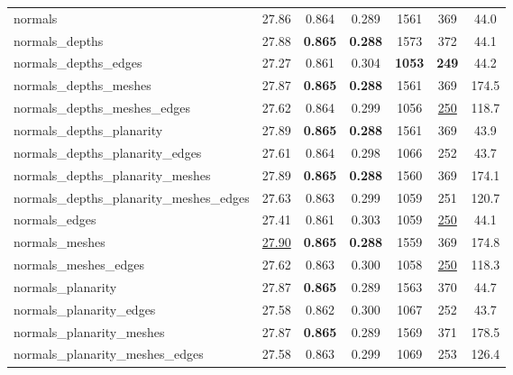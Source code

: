\begin{table}[t]
{\begin{tabular}{@{}l|cccccc@{}}
normals & 27.86 & 0.864 & \cellcolor{green!40}0.289 & 1561 & \cellcolor{green!20}369 & 44.0 \\
normals\_depths & 27.88 & \cellcolor{green!70}\textbf{0.865} & \cellcolor{green!70}\textbf{0.288} & 1573 & 372 & 44.1 \\
normals\_depths\_edges & 27.27 & 0.861 & 0.304 & \cellcolor{green!70}\textbf{1053} & \cellcolor{green!70}\textbf{249} & 44.2 \\
normals\_depths\_meshes & 27.87 & \cellcolor{green!70}\textbf{0.865} & \cellcolor{green!70}\textbf{0.288} & 1561 & \cellcolor{green!20}369 & 174.5 \\
normals\_depths\_meshes\_edges & 27.62 & 0.864 & \cellcolor{green!20}0.299 & \cellcolor{green!20}1056 & \cellcolor{green!40}\underline{250} & 118.7 \\
normals\_depths\_planarity & \cellcolor{green!20}27.89 & \cellcolor{green!70}\textbf{0.865} & \cellcolor{green!70}\textbf{0.288} & 1561 & \cellcolor{green!20}369 & 43.9 \\
normals\_depths\_planarity\_edges & 27.61 & 0.864 & \cellcolor{green!20}0.298 & 1066 & \cellcolor{green!20}252 & 43.7 \\
normals\_depths\_planarity\_meshes & \cellcolor{green!20}27.89 & \cellcolor{green!70}\textbf{0.865} & \cellcolor{green!70}\textbf{0.288} & 1560 & \cellcolor{green!20}369 & 174.1 \\
normals\_depths\_planarity\_meshes\_edges & 27.63 & \cellcolor{green!20}0.863 & \cellcolor{green!20}0.299 & 1059 & \cellcolor{green!20}251 & 120.7 \\
normals\_edges & 27.41 & 0.861 & 0.303 & 1059 & \cellcolor{green!40}\underline{250} & 44.1 \\
normals\_meshes & \cellcolor{green!40}\underline{27.90} & \cellcolor{green!70}\textbf{0.865} & \cellcolor{green!70}\textbf{0.288} & 1559 & \cellcolor{green!20}369 & 174.8 \\
normals\_meshes\_edges & 27.62 & \cellcolor{green!20}0.863 & 0.300 & 1058 & \cellcolor{green!40}\underline{250} & 118.3 \\
normals\_planarity & 27.87 & \cellcolor{green!70}\textbf{0.865} & \cellcolor{green!40}0.289 & 1563 & 370 & 44.7 \\
normals\_planarity\_edges & 27.58 & 0.862 & 0.300 & 1067 & \cellcolor{green!20}252 & 43.7 \\
normals\_planarity\_meshes & 27.87 & \cellcolor{green!70}\textbf{0.865} & \cellcolor{green!40}0.289 & 1569 & 371 & 178.5 \\
normals\_planarity\_meshes\_edges & 27.58 & \cellcolor{green!20}0.863 & \cellcolor{green!20}0.299 & 1069 & \cellcolor{green!20}253 & 126.4 \\

\end{tabular}}
\end{table}

